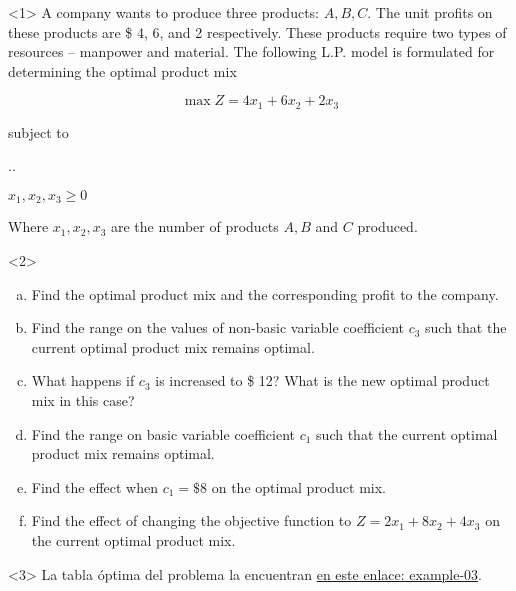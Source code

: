 \begin{frameExample}{\label{example:6.6-2.1}}{}
  \begin{onlyenv}<1>
      A company wants to produce three products: $A, B, C$. The unit profits on these products are \$ 4, 6, and 2 respectively. These products require two types of resources -- manpower and material. The following L.P. model is formulated for determining the optimal product mix

  \[\max Z = 4x_1 +6x_2 +2x_3 \]

  {\centering
    subject to

    \vspace{3mm}
    \sysdelim..%

  $x_1, x_2, x_3 \geq 0$
  \par}

  Where   $x_1, x_2, x_3$ are the number of products $A, B $ and $C$ produced.
  \end{onlyenv}

\begin{onlyenv}<2>
  \begin{enumerate}[a)] \justifying \parskip3mm
  \item Find the optimal product mix and the corresponding profit to the company.
  \item Find the range on the values of non-basic variable coefficient $c_3$ such that the current optimal product mix remains optimal.
  \item What happens if $c_3$ is increased to \$ 12? What is the new optimal product mix in this case?
  \item Find the range on basic variable coefficient $c_1$ such that the current optimal product mix remains optimal.
  \item Find the effect when $c_1 = \$8$ on the optimal product mix.
  \item Find the effect of changing the objective function to $Z = 2x_1 + 8x_2 + 4x_3$ on the current optimal product mix.
  \end{enumerate}
\end{onlyenv}

\begin{onlyenv}<3>
  La tabla óptima del problema la encuentran \href{https://docs.google.com/spreadsheets/d/1HxunHqs_xUDkxKxFEE2Btu5kVv5buHvV2NC5ODKJBQA/edit?usp=sharing}{en este enlace: example-03}.


\end{onlyenv}
\end{frameExample}
